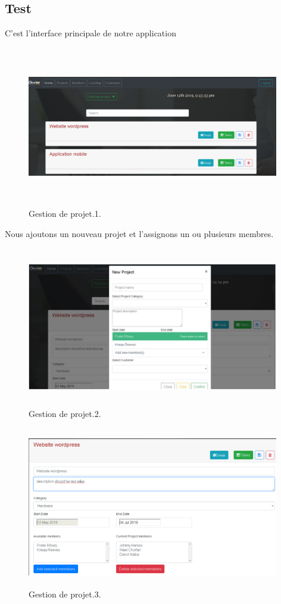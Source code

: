\subsection{Test}
C'est l'interface principale de notre application
\FloatBarrier
\begin{figure}[H]
\center
\includegraphics[width=11cm,height=7cm]{./figures/pres/gp1.png}
\caption{Gestion de projet.1.}
\end{figure}
\FloatBarrier

Nous ajoutons un nouveau projet et l'assignons un ou plusieurs membres.
\FloatBarrier
\begin{figure}[H]
\center
\includegraphics[width=11cm,height=7cm]{./figures/pres/gp2.png}
\caption{Gestion de projet.2.}
\end{figure}
\FloatBarrier

\FloatBarrier
\begin{figure}[H]
\center
\includegraphics[width=11cm,height=7cm]{./figures/pres/gp3.png}
\caption{Gestion de projet.3.}
\end{figure}
\FloatBarrier

